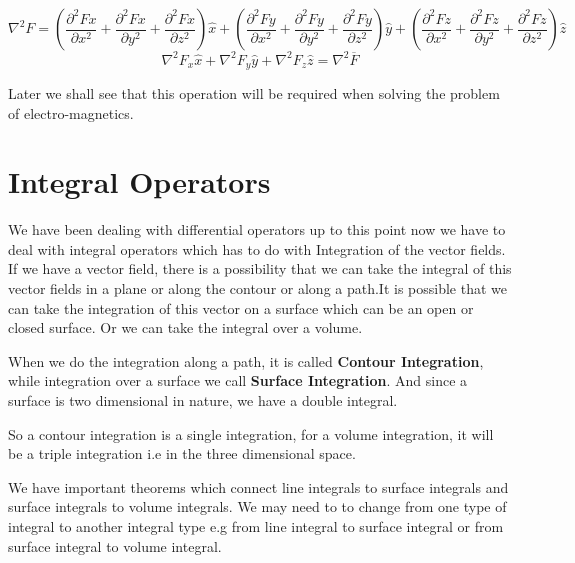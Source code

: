 	\begin{dmath*}
	\nabla^{2}F = (\frac{\partial ^{2} Fx}{\partial x^2} + \frac{\partial ^{2} Fx}{\partial y^2} + \frac{\partial ^{2} Fx}{\partial z^2})\hat{x} + (\frac{\partial ^{2} Fy}{\partial x^2} + \frac{\partial ^{2} Fy}{\partial y^2} + \frac{\partial ^{2} Fy}{\partial z^2})\hat{y} + (\frac{\partial ^{2} Fz}{\partial x^2} + \frac{\partial ^{2} Fz}{\partial y^2} + \frac{\partial ^{2} Fz}{\partial z^2})\hat{z}
	\end{dmath*}
	\begin{equation}
	\nabla^{2}F_x \hat x + \nabla^{2}F_y \hat y + \nabla^{2}F_z \hat z = \nabla^{2}\overline{F}
	\end{equation}

Later we shall see that this operation will be required when solving the problem of electro-magnetics.
	
\section{Integral Operators}

We have been dealing with differential operators up to this point now we have to deal with integral operators which has to do with Integration of the vector fields. If we have a vector field, there is a possibility that we can take the integral of this vector fields in a plane or along the contour or along a path.It is possible that we can take the integration of this vector on a surface which can be an open or closed surface. Or we can take the integral over a volume. 
 
When we do the integration along a path, it is called \textbf{Contour Integration}, while integration over a surface we call \textbf{Surface Integration}. And since a surface is two dimensional in nature, we have a double integral.

So a contour integration is a single integration, for a volume integration, it will be a triple integration i.e in the three dimensional space.

We have important theorems which connect line integrals to surface integrals and surface integrals to volume integrals. We may need to to change from one type of integral to another integral type e.g from line integral to surface integral or from surface integral to volume integral.

